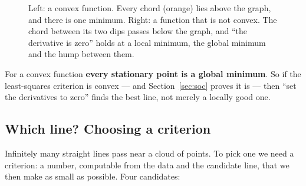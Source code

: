 \documentclass[11pt]{article}
\begin{document}
\begin{figure}[htbp]
  \centering
  \caption{Left: a convex function. Every chord (orange) lies above the
    graph, and there is one minimum. Right: a function that is not convex.
    The chord between its two dips passes below the graph, and ``the
    derivative is zero'' holds at a local minimum, the global minimum and the
    hump between them.}
  \label{fig:convex}
\end{figure}

\begin{keyidea}
For a convex function \textbf{every stationary point is a global minimum}.
So if the least-squares criterion is convex --- and
Section~\ref{sec:soc} proves it is --- then ``set the derivatives to zero''
finds the best line, not merely a locally good one.
\end{keyidea}

\subsection{Which line? Choosing a criterion}
\label{sec:criterion}

Infinitely many straight lines pass near a cloud of points. To pick one we
need a criterion: a number, computable from the data and the candidate line,
that we then make as small as possible. Four candidates:
\end{document}

